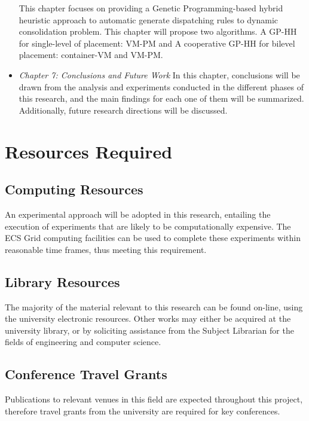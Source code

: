 \begin{itemize}
	This chapter focuses on providing a Genetic Programming-based hybrid heuristic approach to automatic generate dispatching rules to dynamic consolidation problem. This chapter will propose two algorithms. A GP-HH for single-level of placement: VM-PM and A cooperative GP-HH for bilevel placement: container-VM and VM-PM.
	\item \textit{Chapter 7: Conclusions and Future Work}
	In this chapter, conclusions will be drawn from the analysis and experiments conducted in the different phases of this research, and the main findings for each one of them will be summarized. Additionally, future research directions will be discussed.

\end{itemize}


\section{Resources Required}
\subsection{Computing Resources}
An experimental approach will be adopted in this research, entailing the execution of experiments that are likely to be computationally expensive. The ECS Grid computing facilities
can be used to complete these experiments within reasonable time frames, thus meeting this requirement.
\subsection{Library Resources}
The majority of the material relevant to this research can be found on-line, using the university electronic resources. Other works may either be acquired at the university library, or
by soliciting assistance from the Subject Librarian for the fields of engineering and computer science.
\subsection{Conference Travel Grants}
Publications to relevant venues in this field are expected throughout this project, therefore
travel grants from the university are required for key conferences.